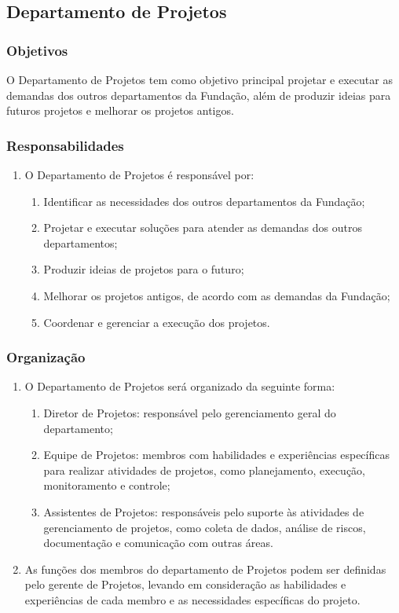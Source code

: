     \subsection{Departamento de Projetos}
        \subsubsection{Objetivos}
        O Departamento de Projetos tem como objetivo principal projetar e executar as demandas dos outros departamentos da Fundação, além de produzir ideias para futuros projetos e melhorar os projetos antigos.
        \subsubsection{Responsabilidades}
        \begin{enumerate}
            \item O Departamento de Projetos é responsável por:
            \begin{enumerate}
                \item Identificar as necessidades dos outros departamentos da Fundação;
                \item  Projetar e executar soluções para atender as demandas dos outros departamentos;
                \item Produzir ideias de projetos para o futuro;
                \item Melhorar os projetos antigos, de acordo com as demandas da Fundação;
                \item Coordenar e gerenciar a execução dos projetos.
            \end{enumerate}
        \end{enumerate}

        \subsubsection{Organização}
        \begin{enumerate}
            \item O Departamento de Projetos será organizado da seguinte forma:
            \begin{enumerate}
                \item Diretor de Projetos: responsável pelo gerenciamento geral do departamento;
                \item Equipe de Projetos: membros com habilidades e experiências específicas para realizar atividades de projetos, como planejamento, execução, monitoramento e controle;
                \item Assistentes de Projetos: responsáveis pelo suporte às atividades de gerenciamento de projetos, como coleta de dados, análise de riscos, documentação e comunicação com outras áreas.
            \end{enumerate}
            \item As funções dos membros do departamento de Projetos podem ser definidas pelo gerente de Projetos, levando em consideração as habilidades e experiências de cada membro e as necessidades específicas do projeto.
        \end{enumerate}
